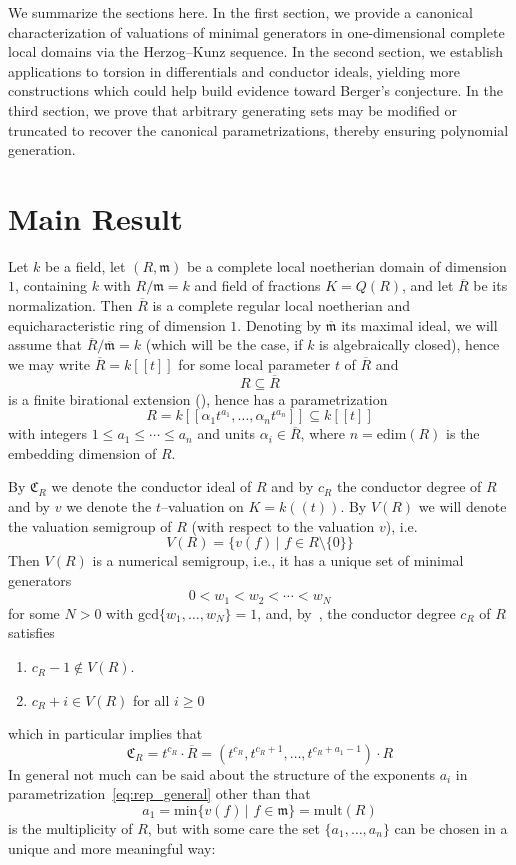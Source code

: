 \documentclass[12pt]{amsart}
\theoremstyle{plain}%
\theoremstyle{definition}
\renewcommand{\(}{\left(}
\renewcommand{\)}{\right)}
\renewcommand{\leq}{\leqslant}
\renewcommand{\geq}{\geqslant}
\begin{document}
We summarize the sections here. In the first section, we provide a canonical characterization of valuations of minimal generators in one-dimensional complete local domains via the Herzog--Kunz sequence. In the second section, we establish applications to torsion in differentials and conductor ideals, yielding more constructions which could help build evidence toward Berger’s conjecture. In the third section, we prove that arbitrary generating sets may be modified or truncated to recover the canonical parametrizations, thereby ensuring polynomial generation. 

\section{Main Result}

Let $k$ be a field, let $(R, \mathfrak m)$ be a complete 
local noetherian domain of dimension $1$, containing $k$ 
with $R/\mathfrak {m} = k$ and field of 
fractions $K = Q(R)$, and let $\overline{R}$ be its normalization. Then $\overline{R}$ 
is a complete regular local noetherian and equicharacteristic ring of dimension $1$. 
Denoting by $\overline{\mathfrak m}$ its maximal ideal,  we will assume that 
$\overline{R}/\overline{\mathfrak m} = k$ (which will be the case, if $k$ is 
algebraically closed), hence we may  write  $\overline{R} = k[[t]]$ for 
some local parameter $t$ of $\overline{R}$ and
	$$ R \subseteq \overline{R} $$ 
is a finite birational extension (\cite[Theorem 4.3.4]{SH}), hence has a parametrization  
	\begin{equation}\label{eq:rep_general}
	 R = k[[\alpha_1 t^{a_1}, \ldots, \alpha_n t^{a_n} ]] \subseteq k[[t]] 
	\end{equation}
with integers $1 \leq a_1\leq \cdots \leq a_n$ and units $\alpha_i \in \overline{R}$, where 
$n = \mathrm{edim}(R)$ is the embedding dimension of $R$. 

By $\mathfrak C_R$ we denote the conductor ideal of $R$ and by $c_R$ the conductor degree of $R$ and by $v$ we 
denote the $t$--valuation on $K = k((t))$. By $V(R)$ we 
will denote the valuation semigroup of $R$ (with respect 
to the valuation $v$), i.e. 
	$$ V(R)=\{v(f)\, \vert\,\, f \in R \setminus \{0\}\} $$
Then $V(R)$ is a numerical semigroup, i.e., it has a unique 
set of minimal generators 
	$$ 0 < w_1 < w_2 < \cdots < w_N $$
for some $N > 0$ with $\mathrm{gcd}\{w_1, \ldots, w_N\} 
= 1$, and, by~\cite[(2.4)]{HK}, the conductor 
degree $c_R$  of $R$ satisfies 
	\begin{enumerate}
	\item $c_R - 1 \notin V(R)$. 
	\item $c_R+i \in V(R)$ for all $i \geq 0$
	\end{enumerate}
which in particular implies that 
	$$ \mathfrak C_R = t^{c_R} \cdot \overline{R} = (t^{c_R}, 
    t^{c_R+1}, \ldots , t^{c_R+a_1-1}) \cdot R  $$
In general not much can be said about the structure of the 
exponents $a_i$ in parametrization~\eqref{eq:rep_general} 
other than that 
	$$ a_1 = \mathrm{min}\{v(f)\, \vert \,\, f \in 
    \mathfrak m \} = \mathrm{mult}(R) $$
is the multiplicity of $R$, but with some care the set 
$\{a_1, \ldots, a_n\}$ can be chosen in 
a unique  and more meaningful way: 
\end{document}
